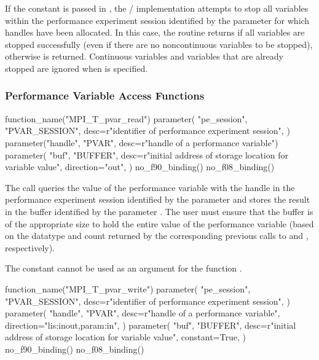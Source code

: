If the constant  is passed in
, the \MPI/ implementation attempts to stop all variables
within the performance experiment session identified by the parameter  for
which handles have been allocated.  In this case, the routine returns
 if all variables are stopped successfully (even if
there are no noncontinuous variables to be stopped), otherwise
 is returned.  Continuous variables
and variables that are already stopped are ignored when
 is specified.


\subsubsection{Performance Variable Access Functions}

\begin{mpi-binding}
    function_name("MPI_T_pvar_read")
    parameter(
        "pe_session",
        "PVAR_SESSION",
        desc=r"identifier of performance experiment session",
    )
    parameter("handle", "PVAR", desc=r"handle of a performance variable")
    parameter(
        "buf",
        "BUFFER",
        desc=r"initial address of storage location for variable value",
        direction="out",
    )
    no_f90_binding()
    no_f08_binding()
\end{mpi-binding}

The  call queries the value of the performance
variable with the handle  in the performance experiment session identified by the
parameter  and stores the result in the buffer identified
by the parameter .  The user must ensure that the
buffer is of the appropriate size to hold the entire value of the
performance variable (based on the datatype and count returned by the
corresponding previous calls to  and
, respectively).

The constant  cannot be used as an
argument for the function .

\begin{mpi-binding}
    function_name("MPI_T_pvar_write")
    parameter(
        "pe_session",
        "PVAR_SESSION",
        desc=r"identifier of performance experiment session",
    )
    parameter(
        "handle",
        "PVAR",
        desc=r"handle of a performance variable",
        direction="lis:inout,param:in",
    )
    parameter(
        "buf",
        "BUFFER",
        desc=r"initial address of storage location for variable value",
        constant=True,
    )
    no_f90_binding()
    no_f08_binding()
\end{mpi-binding}

